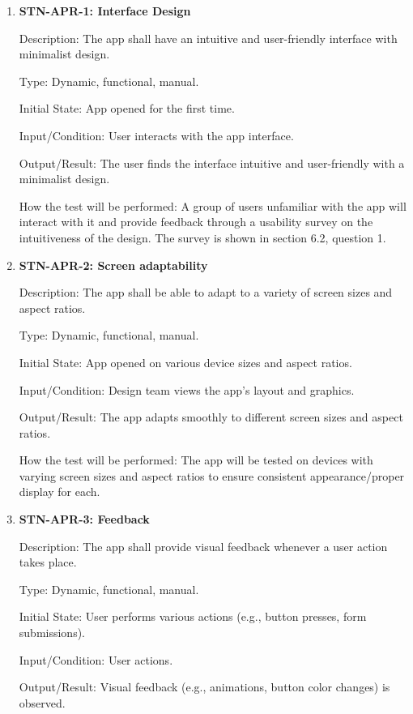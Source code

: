 \documentclass[12pt, titlepage]{article}
\begin{document}
    \begin{enumerate}

        \item \textbf{STN-APR-1: Interface Design}

        Description: The app shall have an intuitive and user-friendly interface with minimalist design.

        Type: Dynamic, functional, manual.

        Initial State: App opened for the first time.

        Input/Condition: User interacts with the app interface.

        Output/Result: The user finds the interface intuitive and user-friendly with a minimalist design.

        How the test will be performed: A group of users unfamiliar with the app will interact with it and provide feedback through a usability survey on the intuitiveness of the design. The survey is shown in section 6.2, question 1.

        \item\textbf{STN-APR-2: Screen adaptability}

        Description: The app shall be able to adapt to a variety of screen sizes and aspect ratios.

        Type: Dynamic, functional, manual.

        Initial State: App opened on various device sizes and aspect ratios.

        Input/Condition: Design team views the app's layout and graphics.

        Output/Result: The app adapts smoothly to different screen sizes and aspect ratios.

        How the test will be performed: The app will be tested on devices with varying screen sizes and aspect ratios to ensure consistent appearance/proper display for each.


        \item \textbf{STN-APR-3: Feedback}

        Description: The app shall provide visual feedback whenever a user action takes place.

        Type: Dynamic, functional, manual.

        Initial State: User performs various actions (e.g., button presses, form submissions).

        Input/Condition: User actions.

        Output/Result: Visual feedback (e.g., animations, button color changes) is observed.


\end{enumerate}
\end{document}
